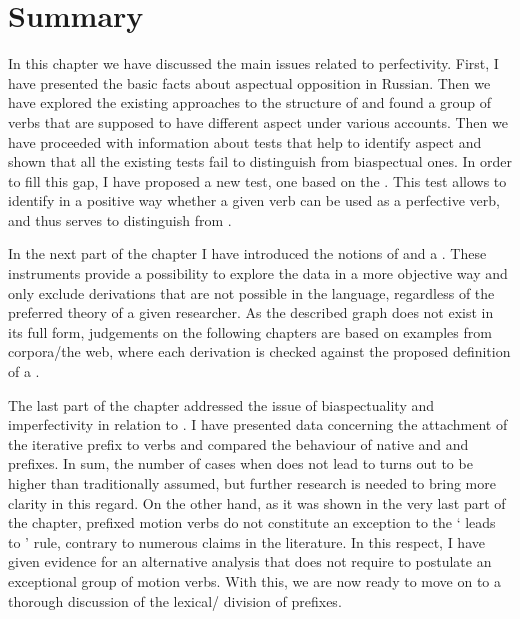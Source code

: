 \section{Summary}
In this chapter we have discussed the main issues related to perfectivity. First, I have presented the basic facts about aspectual opposition in Russian. Then we have explored the existing approaches to the  structure of  and found a group of verbs that are supposed to have different aspect under various accounts. Then we have proceeded with information about tests that help to identify aspect and shown that all the existing tests fail to distinguish  from biaspectual ones. In order to fill this gap, I have proposed a new test, one based on the . This test allows to identify in a positive way whether a given verb can be used as a perfective verb, and thus serves to distinguish  from .

In the next part of the chapter I have introduced the notions of  and a . These instruments provide a possibility to explore the data in a more objective way and only exclude derivations that are not possible in the language, regardless of the preferred theory of a given researcher. As the described graph does not exist in its full form, judgements on the following chapters are based on examples from corpora/the web, where each derivation is checked against the proposed definition of a .

The last part of the chapter addressed the issue of biaspectuality and imperfectivity in relation to . I have presented data concerning the attachment of the iterative prefix  to  verbs and compared the behaviour of native and   and prefixes. In sum, the number of cases when  does not lead to  turns out to be higher than traditionally assumed, but further research is needed to bring more clarity in this regard. On the other hand, as it was shown in the very last part of the chapter, prefixed motion verbs do not constitute an exception to the ` leads to ' rule, contrary to numerous claims in the literature. In this respect, I have given evidence for an alternative analysis that does not require to postulate an exceptional group of motion verbs. With this, we are now ready to move on to a thorough discussion of the lexical/ division of prefixes.

